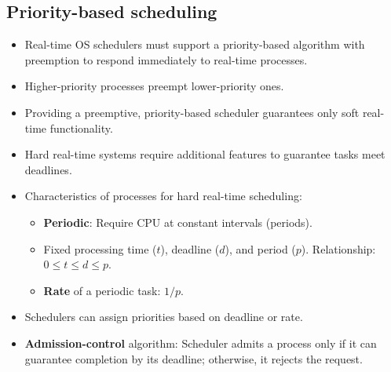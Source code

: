 \subsection{Priority-based scheduling}
\begin{itemize}
    \item Real-time OS schedulers must support a priority-based algorithm with preemption to respond immediately to real-time processes.
    \item Higher-priority processes preempt lower-priority ones.
    \item Providing a preemptive, priority-based scheduler guarantees only soft real-time functionality.
    \item Hard real-time systems require additional features to guarantee tasks meet deadlines.
    \item Characteristics of processes for hard real-time scheduling:
        \begin{itemize}
            \item \textbf{Periodic}: Require CPU at constant intervals (periods).
            \item Fixed processing time ($t$), deadline ($d$), and period ($p$). Relationship: $0 \le t \le d \le p$.
            \item \textbf{Rate} of a periodic task: $1/p$.
        \end{itemize}
    \item Schedulers can assign priorities based on deadline or rate.
    \item \textbf{Admission-control} algorithm: Scheduler admits a process only if it can guarantee completion by its deadline; otherwise, it rejects the request.
\end{itemize}

